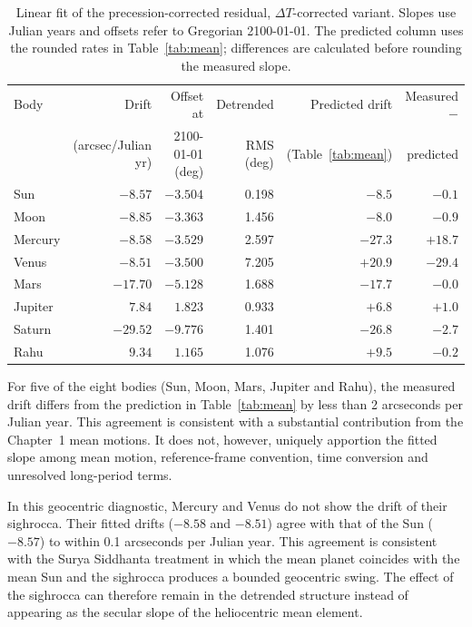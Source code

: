 \documentclass[11pt,a4paper]{article}
\newcommand{\toprule}{\hline\hline}%
\newcommand{\midrule}{\hline}%
\newcommand{\bottomrule}{\hline\hline}}
\newcommand{\dT}{$\Delta T$}
\begin{document}
\begin{table}[htbp]
\centering
\caption{Linear fit of the precession-corrected residual, \dT{}-corrected variant. Slopes use Julian years and offsets refer to Gregorian 2100-01-01. The predicted column uses the rounded rates in Table~\ref{tab:mean}; differences are calculated before rounding the measured slope.}
\label{tab:decomp}
\small
\begin{tabular}{@{}lrrrrr@{}}
\toprule
Body & Drift & Offset at & Detrended & Predicted drift & Measured $-$ \\
     & (arcsec/Julian yr) & 2100-01-01 (deg) & RMS (deg) & (Table~\ref{tab:mean}) & predicted \\
\midrule
Sun     & $-8.57$  & $-3.504$ & 0.198 & $-8.5$  & $-0.1$  \\
Moon    & $-8.85$  & $-3.363$ & 1.456 & $-8.0$  & $-0.9$  \\
Mercury & $-8.58$  & $-3.529$ & 2.597 & $-27.3$ & $+18.7$ \\
Venus   & $-8.51$  & $-3.500$ & 7.205 & $+20.9$ & $-29.4$ \\
Mars    & $-17.70$ & $-5.128$ & 1.688 & $-17.7$ & $-0.0$  \\
Jupiter & $7.84$   & $1.823$  & 0.933 & $+6.8$  & $+1.0$  \\
Saturn  & $-29.52$ & $-9.776$ & 1.401 & $-26.8$ & $-2.7$  \\
Rahu    & $9.34$   & $1.165$  & 1.076 & $+9.5$  & $-0.2$  \\
\bottomrule
\end{tabular}
\end{table}

For five of the eight bodies (Sun, Moon, Mars, Jupiter and Rahu), the measured drift differs from the prediction in Table~\ref{tab:mean} by less than 2 arcseconds per Julian year. This agreement is consistent with a substantial contribution from the Chapter~1 mean motions. It does not, however, uniquely apportion the fitted slope among mean motion, reference-frame convention, time conversion and unresolved long-period terms.

In this geocentric diagnostic, Mercury and Venus do not show the drift of their sighrocca. Their fitted drifts ($-8.58$ and $-8.51$) agree with that of the Sun ($-8.57$) to within 0.1 arcseconds per Julian year. This agreement is consistent with the Surya Siddhanta treatment in which the mean planet coincides with the mean Sun and the sighrocca produces a bounded geocentric swing. The effect of the sighrocca can therefore remain in the detrended structure instead of appearing as the secular slope of the heliocentric mean element.
\end{document}
